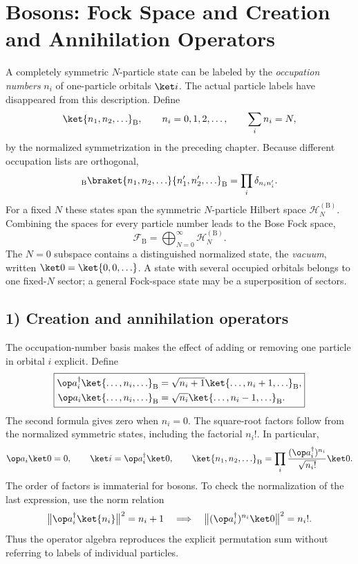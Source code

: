 \section{Bosons: Fock Space and Creation and Annihilation Operators}

A completely symmetric $N$-particle state can be labeled by the \emph{occupation numbers} $n_i$ of one-particle orbitals $\ket i$. The actual particle labels have disappeared from this description. Define
\[\ket{n_1,n_2,\ldots}_{\mathrm B},\qquad
n_i=0,1,2,\ldots,\qquad\sum_i n_i=N,\]
by the normalized symmetrization in the preceding chapter. Because different occupation lists are orthogonal,
\[{}_{\mathrm B}\braket{n_1,n_2,\ldots}{n_1',n_2',\ldots}_{\mathrm B}
=\prod_i\delta_{n_i n_i'}.\]
For a fixed $N$ these states span the symmetric $N$-particle Hilbert space $\mathcal H_N^{(\mathrm B)}$. Combining the spaces for every particle number leads to the Bose Fock space,
\[\boxed{\mathcal F_{\mathrm B}=\bigoplus_{N=0}^\infty\mathcal H_N^{(\mathrm B)}.}\]
The $N=0$ subspace contains a distinguished normalized state, the \emph{vacuum}, written $\ket0=\ket{0,0,\ldots}$. A state with several occupied orbitals belongs to one fixed-$N$ sector; a general Fock-space state may be a superposition of sectors.

\subsection*{1) Creation and annihilation operators}

The occupation-number basis makes the effect of adding or removing one particle in orbital $i$ explicit. Define
\[\boxed{\begin{aligned}
\op a_i^\dagger\ket{\ldots,n_i,\ldots}_{\mathrm B}
  &=\sqrt{n_i+1}\ket{\ldots,n_i+1,\ldots}_{\mathrm B},\\
\op a_i\ket{\ldots,n_i,\ldots}_{\mathrm B}
  &=\sqrt{n_i}\ket{\ldots,n_i-1,\ldots}_{\mathrm B}.
\end{aligned}}\]
The second formula gives zero when $n_i=0$. The square-root factors follow from the normalized symmetric states, including the factorial $n_i!$. In particular,
\[\op a_i\ket0=0,\qquad\ket i=\op a_i^\dagger\ket0,\qquad
\ket{n_1,n_2,\ldots}_{\mathrm B}
=\prod_i\frac{(\op a_i^\dagger)^{n_i}}{\sqrt{n_i!}}\ket0.\]
The order of factors is immaterial for bosons. To check the normalization of the last expression, use the norm relation
\[\bigl\|\op a_i^\dagger\ket{n_i}\bigr\|^2=n_i+1
\quad\Longrightarrow\quad
\bigl\|(\op a_i^\dagger)^{n_i}\ket0\bigr\|^2=n_i!.\]
Thus the operator algebra reproduces the explicit permutation sum without referring to labels of individual particles.

